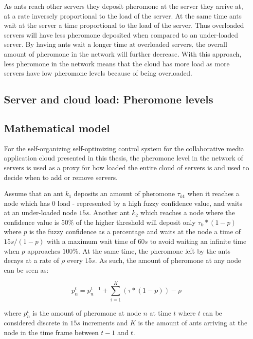 As ants reach other servers they deposit pheromone at the server they arrive at, at a rate inversely proportional to the load of the server. At the same time ants wait at the server a time proportional to the load of the server. Thus overloaded servers will have less pheromone deposited when compared to an under-loaded server. By having ants wait a longer time at overloaded servers, the overall amount of pheromone in the network will further decrease. With this approach, less pheromone in the network means that the cloud has more load as more servers have low pheromone levels because of being overloaded.

\subsection{Server and cloud load: Pheromone levels}

\subsection{Mathematical model}


For the self-organizing self-optimizing control system for the collaborative media application cloud presented in this thesis, the pheromone level in the network of servers is used as a proxy for how loaded the entire cloud of servers is and used to decide when to add or remove servers. 

Assume that an ant $k_{1}$ deposits an amount of pheromone $\tau_{k1}$ when it reaches a node which has 0 load - represented by a high fuzzy confidence value, and waits at an under-loaded node $15s$. Another ant $k_{2}$ which reaches a node where the confidence value is $50\%$ of the higher threshold will deposit only $\tau_{k} * (1 - p)$ where $p$ is the fuzzy confidence as a percentage and waits at the node a time of $15s/(1-p)$ with a maximum wait time of $60s$ to avoid waiting an infinite time when $p$ approaches $100\%$. At the same time, the pheromone left by the ants decays at a rate of $\rho$ every $15s$. As such, the amount of pheromone at any node can be seen as:

\begin{equation}
p^{t}_{n} = p^{t-1}_{n} + \sum_{i=1}^{K}(\tau * (1 - p)) - \rho
\end{equation}

where $p^{t}_{n}$ is the amount of pheromone at node $n$ at time $t$ where $t$ can be considered discrete in $15s$ increments and $K$ is the amount of ants arriving at the node in the time frame between $t-1$ and $t$.

